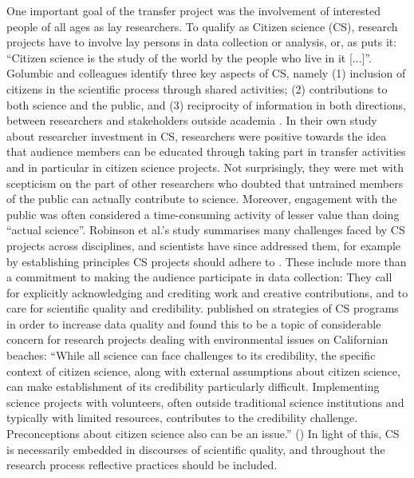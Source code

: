 \documentclass[output=paper,colorlinks,citecolor=brown]{langscibook}
\begin{document}
One important goal of the transfer project was the involvement of interested people of all ages as lay researchers. To qualify as Citizen science (CS), research projects have to involve lay persons in data collection or analysis, or, as \citet[5]{Rymes2020} puts it: “Citizen science is the study of the world by the people who live in it [...]”. Golumbic and colleagues identify three key aspects of CS, namely (1) inclusion of citizens in the scientific process through shared activities; (2) contributions to both science and the public, and (3) reciprocity of information in both directions, between researchers and stakeholders outside academia \citep[6]{Golumbic&al.2017}. In their own study about researcher investment in CS, researchers were positive towards the idea that audience members can be educated through taking part in transfer activities and in particular in citizen science projects. Not surprisingly, they were met with scepticism on the part of other researchers who doubted that untrained members of the public can actually contribute to science. Moreover, engagement with the public was often considered a time\hyp consuming activity of lesser value than doing “actual science”. Robinson et al.’s study summarises many challenges faced by CS projects across disciplines, and scientists have since addressed them, for example by establishing principles CS projects should adhere to \citep{Robinson2018}. These include more than a commitment to making the audience participate in data collection: They call for explicitly acknowledging and crediting work and creative contributions, and to care for scientific quality and credibility. \citet{Freitag&al.2016} published on strategies of CS programs in order to increase data quality and found this to be a topic of considerable concern for research projects dealing with environmental issues on Californian beaches: ``While all science can face challenges to its credibility, the specific context of citizen science, along with external assumptions about citizen science, can make establishment of its credibility particularly difficult. Implementing science projects with volunteers, often outside traditional science institutions and typically with limited resources, contributes to the credibility challenge. Preconceptions about citizen science also can be an issue.'' (\cite[2]{Freitag&al.2016}) In light of this, CS is necessarily embedded in discourses of scientific quality, and throughout the research process reflective practices should be included.
\end{document}
